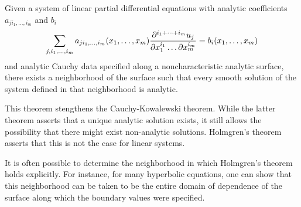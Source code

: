 \documentclass[12pt]{article}
\begin{document}
Given a system of linear partial differential equations with analytic coefficients $a_{j i_1, \ldots ,i_m}$ and $b_i$ 
 $$\sum_{j, i_1,\ldots ,i_m} a_{j i_1, \ldots ,i_m} (x_1, \ldots, x_m) {\partial^{i_1 + \cdots +i_m} u_j \over \partial x_1^{i_1} \ldots \partial x_m^{i_m}} = b_i (x_1, \ldots, x_m)$$
and analytic Cauchy data specified along a noncharacteristic analytic surface, there exists a neighborhood of the surface such that every smooth solution of the system defined in that neighborhood is analytic.

This theorem stengthens the Cauchy-Kowalewski theorem.  While the latter theorem asserts that a unique analytic solution exists, it still allows the possibility that there might exist non-analytic solutions.  Holmgren's theorem asserts that this is not the case for linear systems.

It is often possible to determine the neighborhood in which Holmgren's theorem holds explicitly.  For instance, for many hyperbolic equations, one can show that this neighborhood can be taken to be the entire domain of dependence of the surface along which the boundary values were specified.
\end{document}
